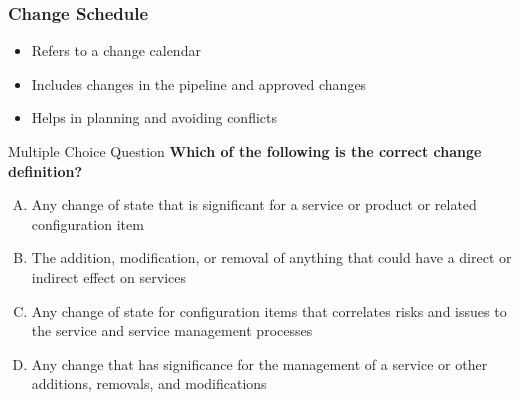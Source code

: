 \documentclass[aspectratio=169, table]{beamer}
\begin{document}
\begin{frame}
	\frametitle{Change Schedule}
	\begin{itemize}
		\item Refers to a change calendar
		\item Includes changes in the pipeline and approved changes
		\item Helps in planning and avoiding conflicts
	\end{itemize}
\end{frame}

\begin{frame}{Multiple Choice Question}
	\textbf{Which of the following is the correct change definition?}
	
	\begin{enumerate}[A.]
		\item Any change of state that is significant for a service or product or related configuration item
		\item The addition, modification, or removal of anything that could have a direct or indirect effect on services
		\item Any change of state for configuration items that correlates risks and issues to the service and service management processes
		\item Any change that has significance for the management of a service or other additions, removals, and modifications
	\end{enumerate}
	
\end{frame}
\end{document}
